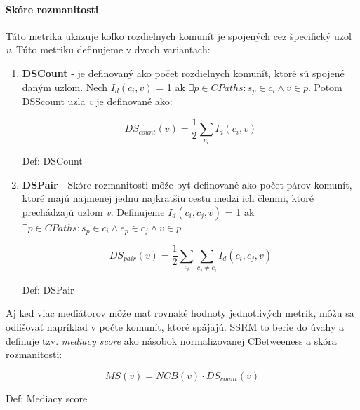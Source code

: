\documentclass[slovak,master,public,dept460,male,cpdeclaration,oneside]{diploma}
\begin{document}
\paragraph{Skóre rozmanitosti}
\hfill \break
Táto metrika ukazuje koľko rozdielnych komunít je spojených cez špecifický uzol \textit{v}. Túto metriku definujeme v dvoch variantach:

\begin{sloppypar}
\begin{enumerate}
\item 

\textbf{DSCount} - je definovaný ako počet rozdielnych komunít, ktoré sú spojené daným uzlom. Nech \textit{${I_d}({c_i}, v)$} = 1 ak \textit{${\exists p \in CPaths: {s_p} \in {c_i} \wedge	v \in p}$}. Potom DSScount uzla \textit{v} je definované ako:


\begin{mycapequ}[!ht]
   \begin{equation*}
    DS_{count}(v) = \frac{1}{2}\sum_{c_{i}} I_{d}(c_{i},v)
   \end{equation*}
   \caption{Def: DSCount}
\end{mycapequ}


\item \textbf{DSPair} - Skóre rozmanitosti môže byť definované ako počet párov komunít, ktoré majú najmenej jednu najkratšiu cestu medzi ich členmi, ktoré prechádzajú uzlom \textit{v}. Definujeme  \textit{${I_d}({c_i},{c_j}, v)$} = 1 ak \textit{${\exists p \in CPaths: {s_p} \in {c_i} \wedge {e_p} \in {c_j} \wedge	v \in p}$}


\begin{mycapequ}[!ht]
   \begin{equation*}
   DS_{pair}(v) = \frac{1}{2}\sum_{c_{i}} \sum_{c_{j}\neq c_{i}} I_{d}(c_{i},c_{j},v)
   \end{equation*}
   \caption{Def: DSPair}
\end{mycapequ}



\end{enumerate}
\end{sloppypar}

Aj keď viac mediátorov môže mať rovnaké hodnoty jednotlivých metrík, 
môžu sa odlišovať napríklad v počte komunít, ktoré spájajú. SSRM to berie do úvahy a definuje tzv. \textit{mediacy score} ako násobok normalizovanej CBetweeness a skóra rozmanitosti:

\begin{mycapequ}[!ht]
   \begin{equation*}
 		MS(v) = NCB(v) \cdot DS_{count}(v) 
   \end{equation*}
   \caption{Def: Mediacy score}
\end{mycapequ}
\end{document}
